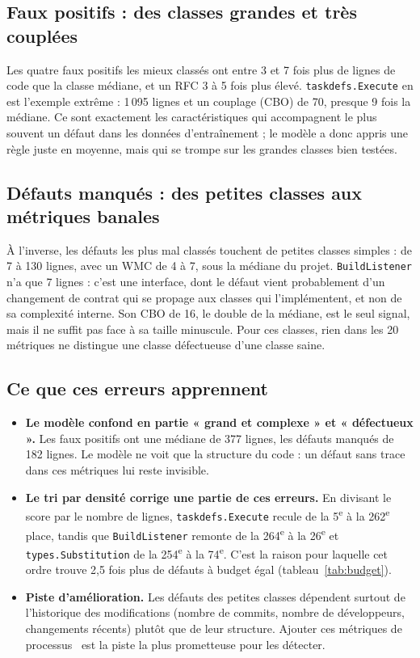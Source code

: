 \documentclass[11pt,a4paper,openany]{report}
\newcommand{\code}[1]{\texttt{\small #1}}
\begin{document}
\subsection{Faux positifs : des classes grandes et très couplées}
Les quatre faux positifs les mieux classés ont entre 3 et 7 fois plus de lignes de code que la classe médiane, et
un RFC 3 à 5 fois plus élevé. \code{taskdefs.Execute} en est l'exemple extrême : 1\,095 lignes et un couplage
(CBO) de 70, presque 9 fois la médiane. Ce sont exactement les caractéristiques qui accompagnent le plus souvent un
défaut dans les données d'entraînement ; le modèle a donc appris une règle juste en moyenne, mais qui se trompe sur
les grandes classes bien testées.

\subsection{Défauts manqués : des petites classes aux métriques banales}
À l'inverse, les défauts les plus mal classés touchent de petites classes simples : de 7 à 130 lignes, avec un WMC
de 4 à 7, sous la médiane du projet. \code{BuildListener} n'a que 7 lignes : c'est une interface, dont le défaut
vient probablement d'un changement de contrat qui se propage aux classes qui l'implémentent, et non de sa
complexité interne. Son CBO de 16, le double de la médiane, est le seul signal, mais il ne suffit pas face à sa
taille minuscule. Pour ces classes, rien dans les 20 métriques ne distingue une classe défectueuse d'une classe
saine.

\subsection{Ce que ces erreurs apprennent}
\begin{itemize}
  \item \textbf{Le modèle confond en partie « grand et complexe » et « défectueux ».} Les faux positifs ont une
        médiane de 377 lignes, les défauts manqués de 182 lignes. Le modèle ne
        voit que la structure du code : un défaut sans trace dans ces métriques lui reste invisible.
  \item \textbf{Le tri par densité corrige une partie de ces erreurs.} En divisant le score par le nombre de lignes,
        \code{taskdefs.Execute} recule de la 5\textsuperscript{e} à la 262\textsuperscript{e} place, tandis que
        \code{BuildListener} remonte de la 264\textsuperscript{e} à la 26\textsuperscript{e} et \code{types.Substitution}
        de la 254\textsuperscript{e} à la 74\textsuperscript{e}. C'est la raison pour laquelle cet ordre trouve 2,5 fois
        plus de défauts à budget égal (tableau~\ref{tab:budget}).
  \item \textbf{Piste d'amélioration.} Les défauts des petites classes dépendent surtout de l'historique des
        modifications (nombre de commits, nombre de développeurs, changements récents) plutôt que de leur structure.
        Ajouter ces métriques de processus~\cite{moser2008} est la piste la plus prometteuse pour les détecter.
\end{itemize}
\end{document}
